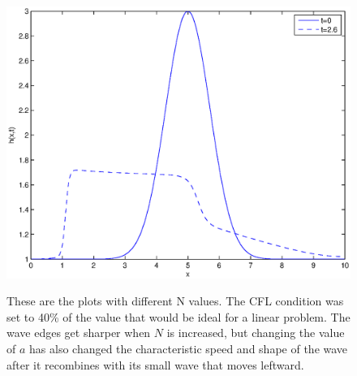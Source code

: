 \begin{enumerate}
\begin{enumerate}
\begin{figure}
{			\includegraphics[width=\hpage]{Figures/plot2p1_n_is_320_a_2.eps}}
			\caption{These are the plots with different N values.  The CFL condition was set to 40\% of the value that would be ideal for a linear problem. The wave edges get sharper when $N$ is increased, but changing the value of $a$ has also changed the characteristic speed and shape of the wave after it recombines with its small wave that moves leftward.} 
			\label{fig:Figure21d}
		\end{figure}
		
	\end{enumerate}
\end{enumerate}

